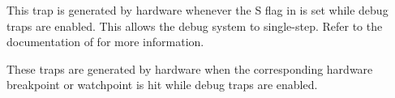 \debug{}

This trap is generated by hardware whenever the S flag in  is set
while debug traps are enabled. This allows the debug system to single-step.
Refer to the documentation of  for more information.


\debug{}

These traps are generated by hardware when the corresponding hardware breakpoint
or watchpoint is hit while debug traps are enabled.

